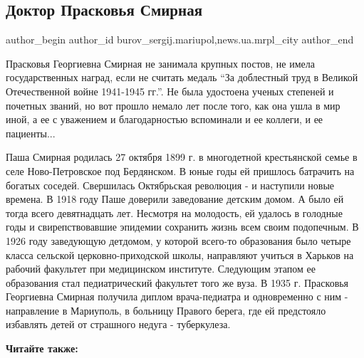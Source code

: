  
 
 
 
 
 
\subsection{Доктор Прасковья Смирная}
\label{sec:02_03_2019.stz.news.ua.mrpl_city.1.doktor_praskovja_smirnaja}
 
\ifcmt
 author_begin
   author_id burov_sergij.mariupol,news.ua.mrpl_city
 author_end
\fi


Прасковья Георгиевна Смирная не занимала крупных постов, не имела
государственных наград, если не считать медаль \enquote{За доблестный труд в Великой
Отечественной войне 1941-1945 гг.}. Не была удостоена ученых степеней и
почетных званий, но вот прошло немало лет после того, как она ушла в мир иной,
а ее с уважением и благодарностью вспоминали и ее коллеги, и ее пациенты...

Паша Смирная родилась 27 октября 1899 г. в многодетной крестьянской семье в
селе Ново-Петровское под Бердянском. В юные годы ей пришлось батрачить на
богатых соседей. Свершилась Октябрьская революция - и наступили новые времена.
В 1918 году Паше доверили заведование детским домом. А было ей тогда всего
девятнадцать лет. Несмотря на молодость, ей удалось в голодные годы и
свирепствовавшие эпидемии сохранить жизнь всем своим подопечным. В 1926 году
заведующую детдомом, у которой всего-то образования было четыре класса сельской
церковно-приходской школы, направляют учиться в Харьков на рабочий факультет
при медицинском институте. Следующим этапом ее образования стал педиатрический
факультет того же вуза. В 1935 г. Прасковья Георгиевна Смирная получила диплом
врача-педиатра и одновременно с ним - направление в Мариуполь, в больницу
Правого берега, где ей предстояло избавлять детей от страшного недуга -
туберкулеза.

\textbf{Читайте также:} 

